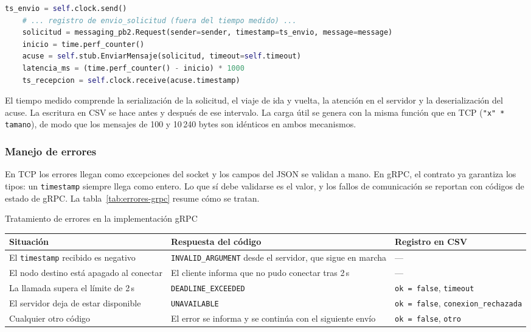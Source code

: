 \begin{lstlisting}[language=Python,caption={Envío y medición del RTT en \texttt{client\_grpc.py}}]
	ts_envio = self.clock.send()
	# ... registro de envio_solicitud (fuera del tiempo medido) ...
	solicitud = messaging_pb2.Request(sender=sender, timestamp=ts_envio, message=message)
	inicio = time.perf_counter()
	acuse = self.stub.EnviarMensaje(solicitud, timeout=self.timeout)
	latencia_ms = (time.perf_counter() - inicio) * 1000
	ts_recepcion = self.clock.receive(acuse.timestamp)
\end{lstlisting}

El tiempo medido comprende la serialización de la solicitud, el viaje de ida y vuelta, la atención en el servidor y la deserialización del acuse. La escritura en CSV se hace antes y después de ese intervalo. La carga útil se genera con la misma función que en TCP (\texttt{"x" * tamano}), de modo que los mensajes de 100 y 10\,240 bytes son idénticos en ambos mecanismos.

\subsubsection{Manejo de errores}

En TCP los errores llegan como excepciones del socket y los campos del JSON se validan a mano. En gRPC, el contrato ya garantiza los tipos: un \texttt{timestamp} siempre llega como entero. Lo que sí debe validarse es el valor, y los fallos de comunicación se reportan con códigos de estado de gRPC. La tabla~\ref{tab:errores-grpc} resume cómo se tratan.

\par\medskip
\noindent\begin{minipage}{\linewidth}
	\centering
	\makeatletter{}\makeatother
	\caption{Tratamiento de errores en la implementación gRPC}
	\label{tab:errores-grpc}
	\begin{tabularx}{\linewidth}{@{}>{\raggedright\arraybackslash}X >{\raggedright\arraybackslash}p{3.6cm} >{\raggedright\arraybackslash}p{3.2cm}@{}}
		\toprule
		Situación & Respuesta del código & Registro en CSV \\
		\midrule
		El \texttt{timestamp} recibido es negativo & \texttt{INVALID\_ARGUMENT} desde el servidor, que sigue en marcha & --- \\
		El nodo destino está apagado al conectar & El cliente informa que no pudo conectar tras 2\,s & --- \\
		La llamada supera el límite de 2\,s & \texttt{DEADLINE\_EXCEEDED} & \texttt{ok = false}, \texttt{timeout} \\
		El servidor deja de estar disponible & \texttt{UNAVAILABLE} & \texttt{ok = false}, \texttt{conexion\_rechazada} \\
		Cualquier otro código & El error se informa y se continúa con el siguiente envío & \texttt{ok = false}, \texttt{otro} \\
		\bottomrule
	\end{tabularx}
\end{minipage}
\par\medskip

